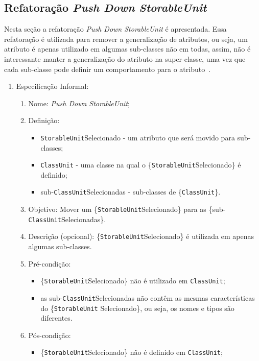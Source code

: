 \subsection{Refatoração \textit{Push Down StorableUnit}}
Nesta seção a refatoração \textit{Push Down StorableUnit} é apresentada. Essa refatoração é utilizada para remover a generalização de atributos, ou seja, um atributo é apenas utilizado em algumas sub-classes não em todas, assim, não é interessante manter a generalização do atributo na super-classe, uma vez que cada sub-classe pode definir um comportamento para o atributo~\cite{Fowler1999}.

\begin{enumerate}
	\item Especificação Informal:
		\begin{enumerate}
			\item Nome: \textit{Push Down StorableUnit};
			\item Definição:
			    \begin{itemize}
			        \item \texttt{StorableUnit}Selecionado - um atributo que será movido para sub-classes;
			        \item \texttt{ClassUnit} - uma classe na qual o \{\texttt{StorableUnit}Selecionado\} é definido;
			        \item sub-\texttt{ClassUnit}Selecionadas - sub-classes de \{\texttt{ClassUnit}\}.
			    \end{itemize}
			\item Objetivo: Mover um \{\texttt{StorableUnit}Selecionado\} para as \{sub-\texttt{ClassUnit}Selecionadas\}.
			\item Descrição (opcional): \{\texttt{StorableUnit}Selecionado\} é utilizada em apenas algumas sub-classes.
			\item Pré-condição:
			    \begin{itemize}
			        \item \{\texttt{StorableUnit}Selecionado\} não é utilizado em \texttt{ClassUnit};
			        \item as sub-\texttt{ClassUnit}Selecionadas não contêm as mesmas características do \{\texttt{StorableUnit} Selecionado\}, ou seja, os nomes e tipos são diferentes.
			    \end{itemize}
			\item Pós-condição:
			    \begin{itemize}
			        \item \{\texttt{StorableUnit}Selecionado\} não é definido em \texttt{ClassUnit};

\end{itemize}
\end{enumerate}
\end{enumerate}
